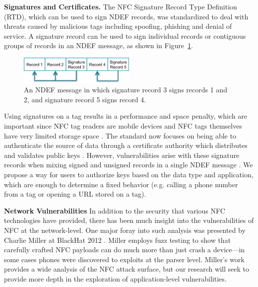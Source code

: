 \documentclass[12pt]{article}
\begin{document}
\textbf{Signatures and Certificates.}
The NFC Signature Record Type Definition (RTD), which can be used to sign NDEF records, was standardized to deal with threats caused by malicious tags including spoofing, phishing and denial of service.
A signature record can be used to sign individual records or contiguous groups of records in an NDEF message, as shown in Figure~\ref{fig:relatedwork:signature}.
\begin{figure}[h!]
\begin{minipage}{\textwidth}
	\centering
		\includegraphics[width=0.5\textwidth]{signed_ndef.png}
	\caption[Caption for LOF]%
  {An NDEF message in which signature record 3 signs records 1 and 2, and signature record 5 signs record 4.}
  \label{fig:relatedwork:signature}

\end{minipage} 
\end{figure}

Using signatures on a tag results in a performance and space penalty, which are important since NFC tag readers are mobile devices and NFC tags themselves have very limited storage space \cite{kilas2009}.
The standard now focuses on being able to authenticate the source of data through a certificate authority which distributes and validates public keys \cite{rosati2011}.
However, vulnerabilities arise with these signature records when mixing signed and unsigned records in a single NDEF message \cite{roland2010,roland2011}.
We propose a way for users to authorize keys based on the data type and application, which are enough to determine a fixed behavior (e.g. calling a phone number from a tag or opening a URL stored on a tag).

\textbf{Network Vulnerabilities}
In addition to the security that various NFC technologies have provided, there has been much insight into the vulnerabilities of NFC at the network-level. 
One major foray into such analysis was presented by Charlie Miller at BlackHat 2012 \cite{miller2012}.
Miller employs fuzz testing to show that carefully crafted NFC payloads can do much more than just crash a device---in some cases phones were discovered to exploits at the parser level.
Miller's work provides a wide analysis of the NFC attack surface, but our research will seek to provide more depth in the exploration of application-level vulnerabilities.
\end{document}
